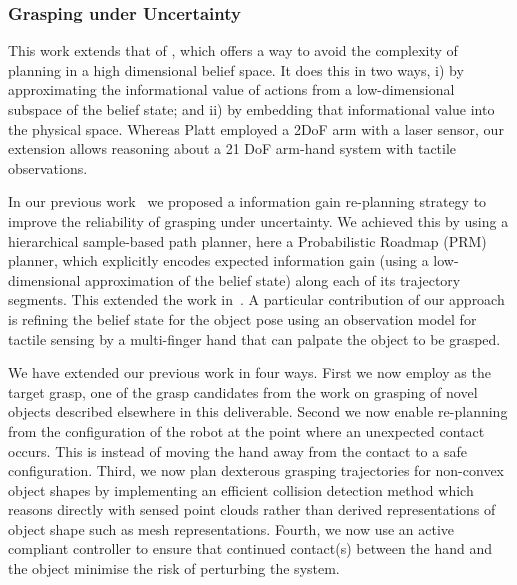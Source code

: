 
\subsubsection{Grasping under Uncertainty}
\label{sec:GraspingUncertainty}

 This work extends that of \cite{bib:platt_csail_2011}, which offers a way to avoid the complexity of planning in a high dimensional belief space. It does this in two ways, i) by approximating the informational value of actions from a low-dimensional subspace of the belief state; and ii) by embedding that informational value into the physical space. Whereas Platt employed a 2DoF arm with a laser sensor, our extension allows reasoning about a 21 DoF arm-hand system with tactile observations. 

In our previous work~\cite{bib:zito_workshop_iros2012, bib:zito_iros_2013} we proposed a information gain re-planning strategy to improve the reliability of grasping under uncertainty. We achieved this by using a hierarchical sample-based path planner, here a Probabilistic Roadmap (PRM) planner, which explicitly encodes expected information gain (using a low-dimensional approximation of the belief state) along each of its trajectory segments. This extended the work in~\cite{bib:platt_csail_2011}. A particular contribution of our approach is refining the belief state for the object pose using an observation model for tactile sensing by a multi-finger hand that can palpate the object to be grasped. 

We have extended our previous work in four ways. First we now employ as the target grasp, one of the grasp candidates from the work on grasping of novel objects described elsewhere in this deliverable. Second we now enable re-planning from the configuration of the robot at the point where an unexpected contact occurs. This is instead of moving the hand away from the contact to a safe configuration. Third, we now plan dexterous grasping trajectories for non-convex object shapes by implementing an efficient collision detection method which reasons directly with sensed point clouds rather than derived representations of object shape such as mesh representations. Fourth, we now use an active compliant controller to ensure that continued contact(s) between the hand and the object minimise the risk of perturbing the system.

